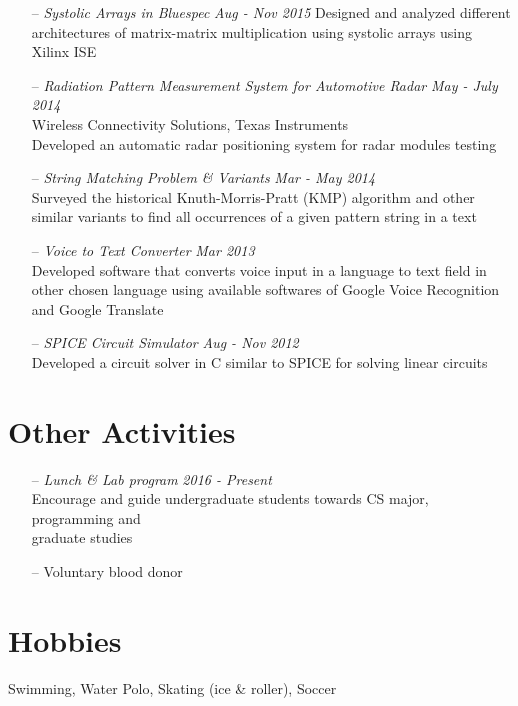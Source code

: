 \documentclass[margin,line,letter]{resume}
\begin{document}
\begin{resume}
\begin{itemize}[leftmargin=*]
    \item[--] \textit{Systolic Arrays in Bluespec} \hfill \emph{Aug - Nov 2015} Designed and analyzed different architectures of matrix-matrix multiplication using systolic arrays using Xilinx ISE

    \item[--] \textit{Radiation Pattern Measurement System for Automotive Radar} \hfill \emph{May - July 2014} \\
    Wireless Connectivity Solutions, Texas Instruments \\
    Developed an automatic radar positioning system for radar modules testing 
    
    \item[--] \textit{String Matching Problem \& Variants} \hfill \emph{Mar - May 2014} \\ Surveyed the historical Knuth-Morris-Pratt (KMP) algorithm and other similar variants to find all occurrences of a given pattern string in a text
 
    \item[--] \textit{Voice to Text Converter} \hfill \emph{Mar 2013} \\ Developed software that converts voice input in a language to text field in other chosen language using available softwares of Google Voice Recognition and Google Translate
    
    \item[--] \textit{SPICE Circuit Simulator} \hfill \emph{Aug - Nov 2012} \\ Developed a circuit solver in C similar to SPICE for solving linear circuits

    \end{itemize}

\section{\mysidestyle Other Activities}
    \noindent
    \begin{itemize}[leftmargin=*]
    \item[--] \textit{Lunch \& Lab program} \hfill \emph{2016 - Present}\\
    Encourage and guide undergraduate students towards CS major, programming and \\ graduate studies
    \item[--] Voluntary blood donor
    \end{itemize}
    
\section{\mysidestyle Hobbies}
    Swimming, Water Polo, Skating (ice \& roller), Soccer

\end{resume}
\end{document}
